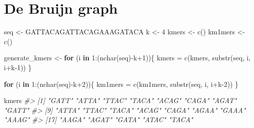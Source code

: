 \documentclass[
]{book}
\newenvironment{Shaded}{\begin{snugshade}}{\end{snugshade}}
\newcommand{\CommentTok}[1]{\textcolor[rgb]{0.56,0.35,0.01}{\textit{#1}}}
\newcommand{\ControlFlowTok}[1]{\textcolor[rgb]{0.13,0.29,0.53}{\textbf{#1}}}
\newcommand{\DecValTok}[1]{\textcolor[rgb]{0.00,0.00,0.81}{#1}}
\newcommand{\FunctionTok}[1]{\textcolor[rgb]{0.00,0.00,0.00}{#1}}
\newcommand{\NormalTok}[1]{#1}
\newcommand{\OtherTok}[1]{\textcolor[rgb]{0.56,0.35,0.01}{#1}}
\newcommand{\SpecialCharTok}[1]{\textcolor[rgb]{0.00,0.00,0.00}{#1}}
\newcommand{\StringTok}[1]{\textcolor[rgb]{0.31,0.60,0.02}{#1}}
\begin{document}
\hypertarget{bruijn}{%
\chapter{De Bruijn graph}\label{bruijn}}

\begin{Shaded}
\begin{Highlighting}[]
\NormalTok{seq     }\OtherTok{\textless{}{-}} \StringTok{\textquotesingle{}GATTACAGATTACAGAAAGATACA\textquotesingle{}}
\NormalTok{k       }\OtherTok{\textless{}{-}} \DecValTok{4}
\NormalTok{kmers   }\OtherTok{\textless{}{-}} \FunctionTok{c}\NormalTok{()}
\NormalTok{km1mers }\OtherTok{\textless{}{-}} \FunctionTok{c}\NormalTok{()}
\end{Highlighting}
\end{Shaded}

\begin{Shaded}
\begin{Highlighting}[]

\NormalTok{generate\_kmers }\OtherTok{\textless{}{-}}
\ControlFlowTok{for}\NormalTok{ (i }\ControlFlowTok{in} \DecValTok{1}\SpecialCharTok{:}\NormalTok{(}\FunctionTok{nchar}\NormalTok{(seq)}\SpecialCharTok{{-}}\NormalTok{k}\SpecialCharTok{+}\DecValTok{1}\NormalTok{))\{}
\NormalTok{  kmers }\OtherTok{=} \FunctionTok{c}\NormalTok{(kmers, }\FunctionTok{substr}\NormalTok{(seq, i, i}\SpecialCharTok{+}\NormalTok{k}\DecValTok{{-}1}\NormalTok{))}
\NormalTok{\}}

\ControlFlowTok{for}\NormalTok{ (i }\ControlFlowTok{in} \DecValTok{1}\SpecialCharTok{:}\NormalTok{(}\FunctionTok{nchar}\NormalTok{(seq)}\SpecialCharTok{{-}}\NormalTok{k}\SpecialCharTok{+}\DecValTok{2}\NormalTok{))\{}
\NormalTok{  km1mers }\OtherTok{=} \FunctionTok{c}\NormalTok{(km1mers, }\FunctionTok{substr}\NormalTok{(seq, i, i}\SpecialCharTok{+}\NormalTok{k}\DecValTok{{-}2}\NormalTok{))}
\NormalTok{\}}
\end{Highlighting}
\end{Shaded}

\begin{Shaded}
\begin{Highlighting}[]
\NormalTok{kmers}
\CommentTok{\#\textgreater{}  [1] "GATT" "ATTA" "TTAC" "TACA" "ACAG" "CAGA" "AGAT" "GATT"}
\CommentTok{\#\textgreater{}  [9] "ATTA" "TTAC" "TACA" "ACAG" "CAGA" "AGAA" "GAAA" "AAAG"}
\CommentTok{\#\textgreater{} [17] "AAGA" "AGAT" "GATA" "ATAC" "TACA"}
\end{Highlighting}
\end{Shaded}
\end{document}
